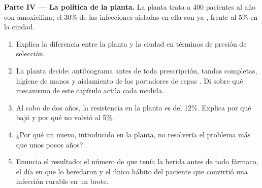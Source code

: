 \begin{problem}
\medskip
\noindent\textbf{Parte IV --- La política de la planta.}
La planta trata a 400 pacientes al año con amoxicilina; el 30\% de las
infecciones aisladas en ella son ya , frente al 5\% en la
ciudad.
\begin{enumerate}[resume]
  \item Explica la diferencia entre la planta y la ciudad en términos
        de presión de selección.
  \item La planta decide: antibiograma antes de toda prescripción,
        tandas completas, higiene de manos y aislamiento de los
        portadores de cepas . Di sobre qué mecanismo de este
        capítulo actúa cada medida.
  \item Al cabo de dos años, la resistencia en la planta es del 12\%.
        Explica por qué bajó y por qué no volvió al 5\%.
  \item ¿Por qué un  nuevo, introducido en la planta, no
        resolvería el problema más que unos pocos años?
  \item Enuncia el resultado: el número de   que
        tenía la herida antes de todo fármaco, el día en que lo
        heredaron y el único hábito del paciente que convirtió una
        infección curable en un brote.
\end{enumerate}
\end{problem}
